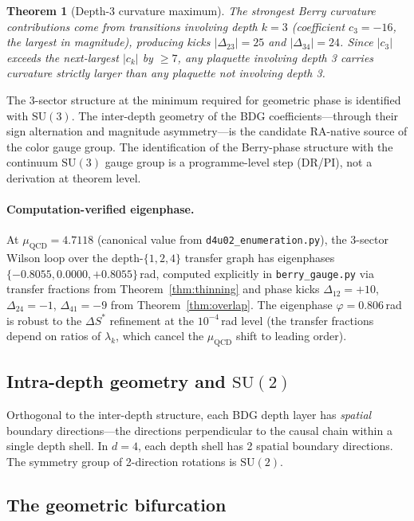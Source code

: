 \documentclass[11pt]{article}
\newtheorem{theorem}{Theorem}
\begin{document}
\begin{theorem}[Depth-3 curvature maximum]
\label{thm:depth3max}
The strongest Berry curvature contributions come from transitions involving depth $k=3$ (coefficient $c_3=-16$, the largest in magnitude), producing kicks $|\Delta_{23}|=25$ and $|\Delta_{34}|=24$. Since $|c_3|$ exceeds the next-largest $|c_k|$ by $\ge 7$, any plaquette involving depth 3 carries curvature strictly larger than any plaquette not involving depth 3.
\end{theorem}

The 3-sector structure at the minimum required for geometric phase is identified with $\mathrm{SU}(3)$. The inter-depth geometry of the BDG coefficients---through their sign alternation and magnitude asymmetry---is the candidate RA-native source of the color gauge group. The identification of the Berry-phase structure with the continuum $\mathrm{SU}(3)$ gauge group is a programme-level step (DR/PI), not a derivation at theorem level.

\paragraph{Computation-verified eigenphase.} At $\mu_{\mathrm{QCD}}=4.7118$ (canonical value from \texttt{d4u02\_enumeration.py}), the 3-sector Wilson loop over the depth-$\{1,2,4\}$ transfer graph has eigenphases $\{-0.8055,0.0000,+0.8055\}$\,rad, computed explicitly in \texttt{berry\_gauge.py} via transfer fractions from Theorem~\ref{thm:thinning} and phase kicks $\Delta_{12}=+10$, $\Delta_{24}=-1$, $\Delta_{41}=-9$ from Theorem~\ref{thm:overlap}. The eigenphase $\varphi=0.806$\,rad is robust to the $\Delta S^*$ refinement at the $10^{-4}$\,rad level (the transfer fractions depend on ratios of $\lambda_k$, which cancel the $\mu_{\mathrm{QCD}}$ shift to leading order).

\subsection{Intra-depth geometry and $\mathrm{SU}(2)$}

Orthogonal to the inter-depth structure, each BDG depth layer has \emph{spatial} boundary directions---the directions perpendicular to the causal chain within a single depth shell. In $d=4$, each depth shell has 2 spatial boundary directions. The symmetry group of 2-direction rotations is $\mathrm{SU}(2)$.

\subsection{The geometric bifurcation}
\end{document}
